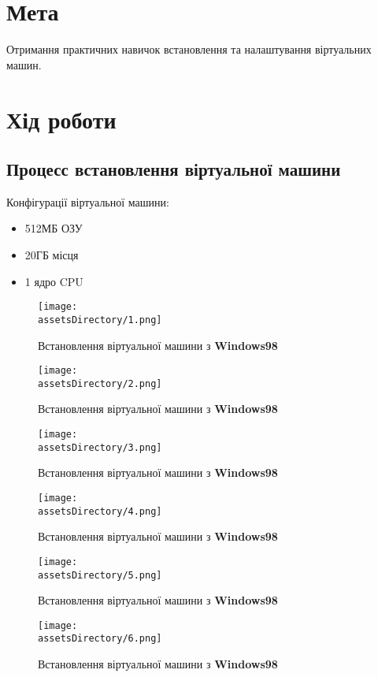 \section{Мета}
Отримання практичних навичок встановлення та
налаштування віртуальних машин.

\section{Хід роботи}
\subsection{Процесс встановлення віртуальної машини}
Конфігурації віртуальної машини:
\begin{itemize}
    \item 512МБ ОЗУ
    \item 20ГБ місця
    \item 1 ядро CPU
\end{itemize}

\begin{figure}[ht!]
    \centering
    \texttt{[image: \\assetsDirectory/1.png]}
    \caption{Встановлення віртуальної машини з \textbf{Windows98}}
\end{figure}

\newpage
\begin{figure}[ht!]
    \centering
    \texttt{[image: \\assetsDirectory/2.png]}
    \caption{Встановлення віртуальної машини з \textbf{Windows98}}
\end{figure}

\begin{figure}[ht!]
    \centering
    \texttt{[image: \\assetsDirectory/3.png]}
    \caption{Встановлення віртуальної машини з \textbf{Windows98}}
\end{figure}

\begin{figure}[ht!]
    \centering
    \texttt{[image: \\assetsDirectory/4.png]}
    \caption{Встановлення віртуальної машини з \textbf{Windows98}}
\end{figure}

\begin{figure}[ht!]
    \centering
    \texttt{[image: \\assetsDirectory/5.png]}
    \caption{Встановлення віртуальної машини з \textbf{Windows98}}
\end{figure}

\begin{figure}[ht!]
    \centering
    \texttt{[image: \\assetsDirectory/6.png]}
    \caption{Встановлення віртуальної машини з \textbf{Windows98}}
\end{figure}

